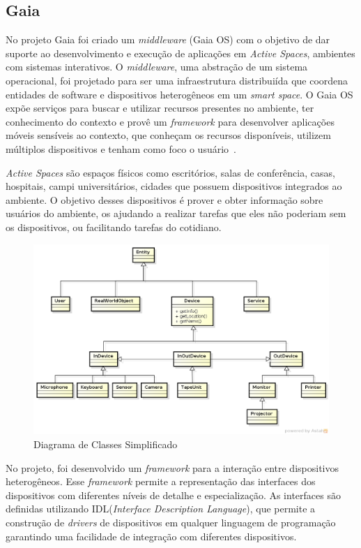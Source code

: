 \subsection{Gaia}
No projeto Gaia foi criado um \emph{middleware} (Gaia OS) com o objetivo de dar suporte ao desenvolvimento e execução de aplicações em \emph{Active Spaces}, ambientes com sistemas interativos. O \emph{middleware}, uma abstração de um sistema operacional, foi projetado para ser uma infraestrutura distribuiída que coordena entidades de software e dispositivos heterogêneos em um \emph{smart space}. O Gaia OS expõe serviços para buscar e utilizar recursos presentes no ambiente, ter conhecimento do contexto e provê um \emph{framework} para desenvolver aplicações móveis sensíveis ao contexto, que conheçam os recursos disponíveis, utilizem múltiplos dispositivos e tenham como foco o usuário~\cite{gaia2002}.

\emph{Active Spaces} são espaços físicos como escritórios, salas de conferência, casas, hospitais, campi universitários, cidades que possuem dispositivos integrados ao ambiente. O objetivo desses dispositivos é prover e obter informação sobre usuários do ambiente, os ajudando a realizar tarefas que eles não poderiam sem os dispositivos, ou facilitando tarefas do cotidiano.

\begin{figure}[ht]
\center
\includegraphics[scale=0.5]{imagens/gaia-devices}
\caption{Diagrama de Classes Simplificado~\cite{gaiaDevices}}
\label{fig:gaiaClassDiagram}
\end{figure}

No projeto, foi desenvolvido um \emph{framework} para a interação entre dispositivos heterogêneos. Esse \emph{framework} permite a representação das interfaces dos dispositivos com diferentes níveis de detalhe e especialização. As interfaces são definidas utilizando IDL(\emph{Interface Description Language}), que permite a construção de \emph{drivers} de dispositivos em qualquer linguagem de programação garantindo uma facilidade de integração com diferentes dispositivos.

